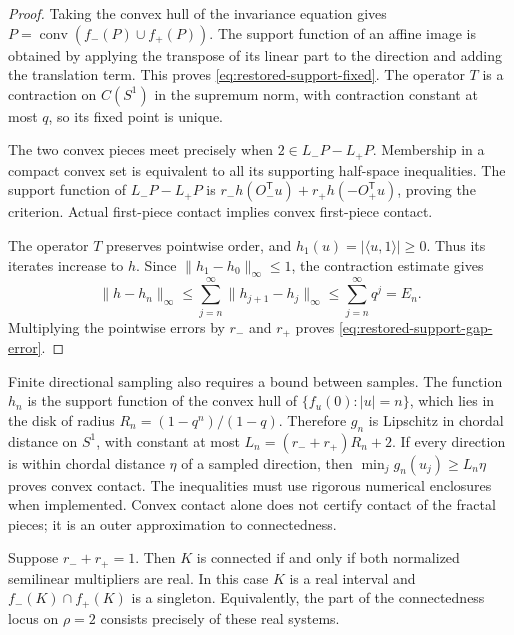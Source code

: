 \begin{proof}
Taking the convex hull of the invariance equation gives
$P=\operatorname{conv}(f_-(P)\cup f_+(P))$. The support function of an
affine image is obtained by applying the transpose of its linear part
to the direction and adding the translation term. This proves
\eqref{eq:restored-support-fixed}. The operator $T$ is a contraction on
$C(S^1)$ in the supremum norm, with contraction constant at most $q$,
so its fixed point is unique.

The two convex pieces meet precisely when
$2\in L_-P-L_+P$. Membership in a compact convex set is equivalent to
all its supporting half-space inequalities. The support function of
$L_-P-L_+P$ is
$r_-h(O_-^{\mathsf T}u)+r_+h(-O_+^{\mathsf T}u)$, proving the criterion.
Actual first-piece contact implies convex first-piece contact.

The operator $T$ preserves pointwise order, and
$h_1(u)=|\langle u,1\rangle|\ge0$. Thus its iterates increase to $h$.
Since $\|h_1-h_0\|_\infty\le1$, the contraction estimate gives
\[
 \|h-h_n\|_\infty\le
 \sum_{j=n}^{\infty}\|h_{j+1}-h_j\|_\infty
 \le\sum_{j=n}^{\infty}q^j=E_n.
\]
Multiplying the pointwise errors by $r_-$ and $r_+$ proves
\eqref{eq:restored-support-gap-error}.
\end{proof}

\begin{remark}
\label{rem:restored-direction-grid}
Finite directional sampling also requires a bound between samples.
The function $h_n$ is the support function of the convex hull of
$\{f_u(0):|u|=n\}$, which lies in the disk of radius
$R_n=(1-q^n)/(1-q)$. Therefore $g_n$ is Lipschitz in chordal distance
on $S^1$, with constant at most
$L_n=(r_-+r_+)R_n+2$.
If every direction is within chordal distance $\eta$ of a sampled
direction, then $\min_j g_n(u_j)\ge L_n\eta$ proves convex contact.
The inequalities must use rigorous numerical enclosures when
implemented. Convex contact alone does not certify contact of the
fractal pieces; it is an outer approximation to connectedness.
\end{remark}

\begin{theorem}
\label{thm:restored-outer-rigidity}
Suppose $r_-+r_+=1$. Then $K$ is connected if and only if both normalized
semilinear multipliers are real. In this case $K$ is a real interval and
$f_-(K)\cap f_+(K)$ is a singleton. Equivalently, the part of the
connectedness locus on $\rho=2$ consists precisely of these real systems.
\end{theorem}

